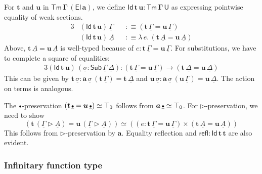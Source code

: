 \documentclass[12pt,a4paper,twoside,openany]{book}
\theoremstyle{remark}
\theoremstyle{definition}
\theoremstyle{theorem}
\newcommand{\bs}[1]{\boldsymbol{#1}}
\newcommand{\refl}{\mathsf{refl}}
\newcommand{\Sub}{\mathsf{Sub}}
\newcommand{\Tm}{\mathsf{Tm}}
\newcommand{\U}{\mathsf{U}}
\newcommand{\El}{\mathsf{El}}
\newcommand{\Id}{\mathsf{Id}}
\newcommand{\ra}{\rightarrow}
\newcommand{\ext}{\triangleright}
\newcommand{\emptycon}{\scaleobj{.75}\bullet}
\newcommand{\bTm}{\bs{\Tm}}
\newcommand{\bGamma}{\bs{\Gamma}}
\newcommand{\bt}{\bs{t}}
\newcommand{\bu}{\bs{u}}
\newcommand{\ba}{\bs{a}}
\newcommand{\bU}{\bs{\U}}
\newcommand{\bEl}{\bs{\El}}
\newcommand{\bId}{\bs{\Id}}
\newcommand{\ul}[1]{\underline{#1}}
\newcommand{\ulGamma}{\ul{\Gamma}}
\newcommand{\ulDelta}{\ul{\Delta}}
\newcommand{\ulsigma}{\ul{\sigma}}
\newcommand{\ulemptycon}{\ul{\emptycon}}
\newcommand{\ulA}{\ul{A}}
\newcommand{\defn}{:\equiv}
\begin{document}
For $\bt$ and $\bu$ in $\bTm\,\bGamma\,(\bEl\,\ba)$, we define $\bId\,\bt\,\bu
\boldsymbol{:} \bTm\,\bGamma\,\bU$ as expressing pointwise equality of weak
sections.
\begin{alignat*}{3}
& (\bId\,\bt\,\bu)\,\ulGamma &&\defn (\bt\,\ulGamma = \bu\,\ulGamma)\\
& (\bId\,\bt\,\bu)\,\ulA     &&\defn \lambda\,e.\, (\bt\,\ulA = \bu\,\ulA)
\end{alignat*}
Above, $\bt\,\ulA = \bu\,\ulA$ is well-typed because of $e :
\bt\,\ulGamma = \bu\,\ulGamma$. For substitutions, we have to complete a square
of equalities:
\begin{alignat*}{3}
  (\bId\,\bt\,\bu)\,(\ulsigma : \Sub\,\ulGamma\,\ulDelta) : (\bt\,\ulGamma = \bu\,\ulGamma) \ra
       (\bt\,\ulDelta = \bu\,\ulDelta)
\end{alignat*}
This can be given by $\bt\,\ulsigma : \ba\,\ulsigma\,(\bt\,\ulGamma) =
\bt\,\ulDelta$ and $\bu\,\ulsigma : \ba\,\ulsigma\,(\bu\,\ulGamma) =
\bu\,\ulDelta$. The action on terms is analogous.

The $\emptycon$-preservation $(\bt\,\ulemptycon = \bu\,\ulemptycon) \simeq
\top_0$ follows from $\ba\,\ulemptycon \simeq \top_0$. For $\ext$-preservation,
we need to show
\[
 (\bt\,(\ulGamma \ext \ulA) = \bu\,(\ulGamma \ext \ulA)) \simeq
 ((e : \bt\,\ulGamma = \bu\,\ulGamma) \times (\bt\,\ulA = \bu\,\ulA))
\]
This follows from $\ext$-preservation by $\ba$. Equality reflection and
$\bs{\refl :} \bId\,\bt\,\bt$ are also evident.

\subsubsection{Infinitary function type}
\end{document}
